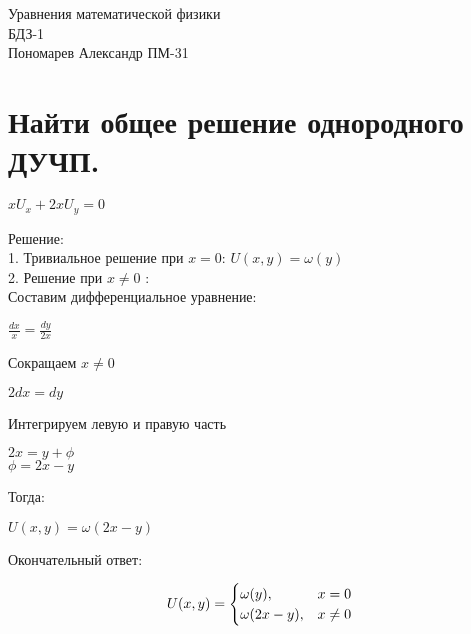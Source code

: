 \documentclass{article}
\begin{document}
	\begin{titlepage}
		\centering
		\huge {Уравнения математической физики \\ БДЗ-1} \\
		\Large {Пономарев Александр ПМ-31} \\
	\end{titlepage}
	
	\section{Найти общее решение однородного ДУЧП.}
	\begin{center}
		$ xU_x+2xU_y=0 $
	\end{center}
    Решение: \\
	1. Тривиальное решение при $ x = 0 $: $ U(x, y) = \omega(y) $ \\
	2. Решение при $ x \neq 0 $ : \\
	Составим дифференциальное уравнение: \\
	\begin{center}
		$\frac{dx}{x}=\frac{dy}{2x}$ \\
	\end{center}
	Сокращаем $ x \neq 0 $ \\
	\begin{center}
		$ 2dx = dy $ \\
	\end{center}
	Интегрируем левую и правую часть \\
	\begin{center}
		$ 2x = y + \phi $ \\
		$ \phi = 2x - y $
	\end{center}
	Тогда:
	\begin{center}
		$ U(x, y) = \omega(2x - y) $ \\
	\end{center}
	Окончательный ответ:
	\begin{center}
		\begin{equation*}
			U(x, y) = 
			 \begin{cases}
			   \omega(y), &\text{$ x = 0 $}\\
			   \omega(2x - y), &\text{$ x \neq 0 $}
			 \end{cases}
		\end{equation*}
	\end{center}

	\newpage
\end{document}
